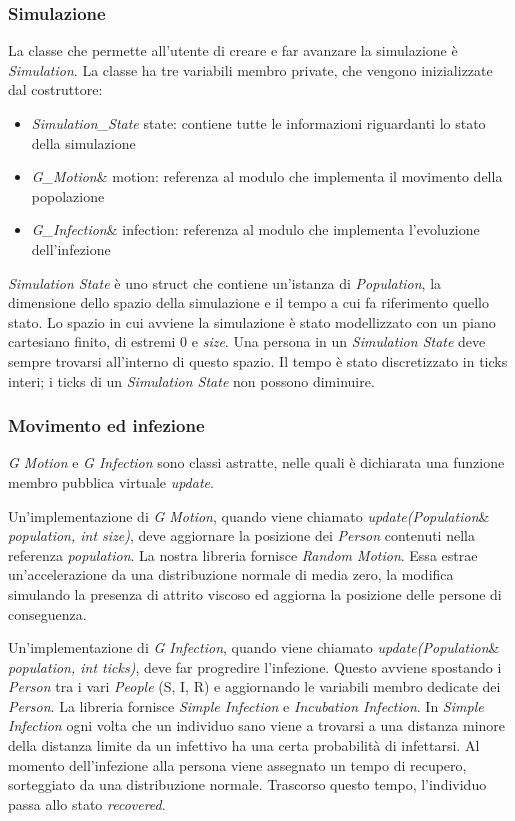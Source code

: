 \documentclass[a4paper,10pt,twocolumn]{article}
\begin{document}
\subsubsection*{Simulazione}
La classe che permette all’utente di creare e far avanzare la simulazione è \emph{Simulation}. La classe ha tre variabili membro private, che vengono inizializzate dal costruttore:
\begin{itemize}
    \item \emph{Simulation\_State} state: contiene tutte le informazioni riguardanti lo stato della simulazione
    \item \emph{G\_Motion}\& motion: referenza al modulo che implementa il movimento della popolazione
    \item \emph{G\_Infection}\& infection: referenza al modulo che implementa l’evoluzione dell’infezione
\end{itemize}

\emph{Simulation State} è uno struct che contiene un’istanza di \emph{Population}, la dimensione dello spazio della simulazione e il tempo a cui fa riferimento quello stato. Lo spazio in cui avviene la simulazione è stato modellizzato con un piano cartesiano finito, di estremi 0 e \emph{size}. Una persona in un \emph{Simulation State} deve sempre trovarsi all’interno di questo spazio. Il tempo è stato discretizzato in ticks interi; i ticks di un \emph{Simulation State} non possono diminuire.

\subsubsection*{Movimento ed infezione}
\emph{G Motion} e \emph{G Infection} sono classi astratte, nelle quali è dichiarata una funzione membro pubblica virtuale \emph{update}.

Un'implementazione di \emph{G Motion}, quando viene chiamato \emph{update(Population}\& \emph{population, int size)}, deve aggiornare la posizione dei \emph{Person} contenuti nella referenza \emph{population}. La nostra libreria fornisce \emph{Random Motion}. Essa estrae un'accelerazione da una distribuzione normale di media zero, la modifica simulando la presenza di attrito viscoso ed aggiorna la posizione delle persone di conseguenza.

Un'implementazione di \emph{G Infection}, quando viene chiamato \emph{update(Population}\& \emph{population, int ticks)}, deve far progredire l’infezione. Questo avviene spostando i \emph{Person} tra i vari \emph{People} (S, I, R) e aggiornando le variabili membro dedicate dei \emph{Person}. La libreria fornisce \emph{Simple Infection} e \emph{Incubation Infection}. In \emph{Simple Infection} ogni volta che un individuo sano viene a trovarsi a una distanza minore della distanza limite da un infettivo ha una certa probabilità di infettarsi. Al momento dell'infezione alla persona viene assegnato un tempo di recupero, sorteggiato da una distribuzione normale. Trascorso questo tempo, l'individuo passa allo stato \emph{recovered}.
\end{document}

